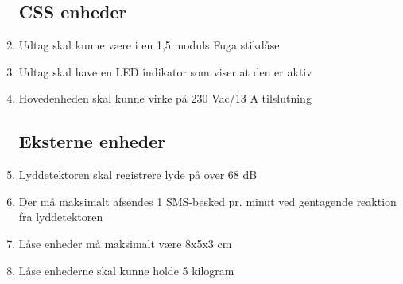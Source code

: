 \begin{enumerate}
	\subsection*{CSS enheder}
	\item Udtag skal kunne være i en 1,5 moduls Fuga stikdåse
	\item Udtag skal have en LED indikator som viser at den er aktiv
	\item Hovedenheden skal kunne virke på 230 Vac/13 A tilslutning

	\subsection*{Eksterne enheder}
	\item Lyddetektoren skal registrere lyde på over 68 dB
	\item Der må maksimalt afsendes 1 SMS-besked pr. minut ved gentagende reaktion fra lyddetektoren
	\item Låse enheder må maksimalt være 8x5x3 cm
	\item Låse enhederne skal kunne holde 5 kilogram

\end{enumerate}
